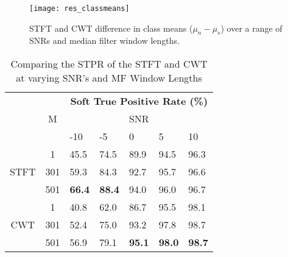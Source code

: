 \begin{figure}[h!]
	\centering
	\texttt{[image: res\_classmeans]}
	\caption[STFT and CWT difference in class means.]{STFT and CWT difference in class means ($\mu_n - \mu_s$) over a range of SNRs and median filter window lengths.}
	\label{fig:res_classmeans}
\end{figure}

\begin{table}[h!]
	\caption{Comparing the STPR of the STFT and CWT at varying SNR's and MF Window Lengths\label{tab:stpr}}
	\centering
\begin{tabular}{cclllll}
\hline
	\multirow{3}{*}{} & \multicolumn{1}{c}{\multirow{3}{*}{M}} & \multicolumn{5}{c}{\textbf{Soft True Positive Rate (\%)}}                   \\
	& \multicolumn{1}{c}{} & \multicolumn{5}{c}{SNR}                  \\ \cline{3-7} 
	& \multicolumn{1}{c}{} & -10  & -5           & 0    & 5   & 10   \\ \hline
\multirow{3}{*}{STFT} & 1                    & 45.5          & 74.5          & 89.9          & 94.5          & 96.3          \\
& 301                  & 59.3          & 84.3          & 92.7          & 95.7          & 96.6          \\
& 501                  & \textbf{66.4} & \textbf{88.4} & 94.0          & 96.0          & 96.7          \\ \hline
\multirow{3}{*}{CWT}  & 1                    & 40.8          & 62.0          & 86.7          & 95.5          & 98.1          \\
& 301                  & 52.4          & 75.0          & 93.2          & 97.8          & 98.7          \\
& 501                  & 56.9          & 79.1          & \textbf{95.1} & \textbf{98.0} & \textbf{98.7} \\ \hline
\end{tabular}
\end{table}

